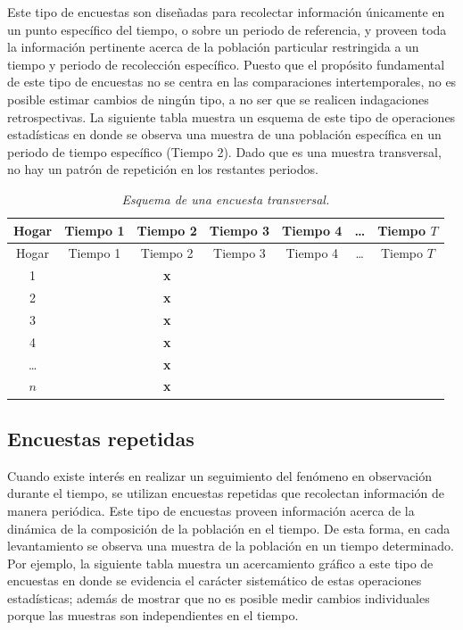 \documentclass[
  12pt,
  spanish,
]{book}
\begin{document}
Este tipo de encuestas son diseñadas para recolectar información únicamente en un punto específico del tiempo, o sobre un periodo de referencia, y proveen toda la información pertinente acerca de la población particular restringida a un tiempo y periodo de recolección específico. Puesto que el propósito fundamental de este tipo de encuestas no se centra en las comparaciones intertemporales, no es posible estimar cambios de ningún tipo, a no ser que se realicen indagaciones retrospectivas. La siguiente tabla muestra un esquema de este tipo de operaciones estadísticas en donde se observa una muestra de una población específica en un periodo de tiempo específico (Tiempo 2). Dado que es una muestra transversal, no hay un patrón de repetición en los restantes periodos.

\begin{longtable}[]{@{}ccccccc@{}}
\caption{\emph{Esquema de una encuesta transversal.}}\tabularnewline
\toprule
Hogar & Tiempo 1 & Tiempo 2 & Tiempo 3 & Tiempo 4 & \ldots{} & Tiempo \(T\) \\
\midrule
\endfirsthead
\toprule
Hogar & Tiempo 1 & Tiempo 2 & Tiempo 3 & Tiempo 4 & \ldots{} & Tiempo \(T\) \\
\midrule
\endhead
1 & & \textbf{x} & & & & \\
2 & & \textbf{x} & & & & \\
3 & & \textbf{x} & & & & \\
4 & & \textbf{x} & & & & \\
\ldots{} & & \textbf{x} & & & & \\
\(n\) & & \textbf{x} & & & & \\
\bottomrule
\end{longtable}

\hypertarget{encuestas-repetidas}{%
\subsection*{Encuestas repetidas}\label{encuestas-repetidas}}

Cuando existe interés en realizar un seguimiento del fenómeno en observación durante el tiempo, se utilizan encuestas repetidas que recolectan información de manera periódica. Este tipo de encuestas proveen información acerca de la dinámica de la composición de la población en el tiempo. De esta forma, en cada levantamiento se observa una muestra de la población en un tiempo determinado. Por ejemplo, la siguiente tabla muestra un acercamiento gráfico a este tipo de encuestas en donde se evidencia el carácter sistemático de estas operaciones estadísticas; además de mostrar que no es posible medir cambios individuales porque las muestras son independientes en el tiempo.
\end{document}
